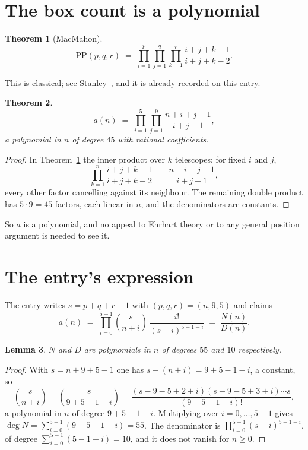 \documentclass[11pt,a4paper]{article}
\theoremstyle{plain}
\newtheorem{theorem}{Theorem}
\newtheorem{lemma}[theorem]{Lemma}
\theoremstyle{definition}
\begin{document}
\section{The box count is a polynomial}

\begin{theorem}[MacMahon]\label{thm:mm}
\[
\mathrm{PP}(p,q,r)\;=\;\prod_{i=1}^{p}\prod_{j=1}^{q}\prod_{k=1}^{r}
\frac{i+j+k-1}{i+j+k-2} .
\]
\end{theorem}

This is classical; see Stanley~\cite{stanley}, and it is already recorded on this entry.

\begin{theorem}\label{thm:poly}
\[
a(n)\;=\;\prod_{i=1}^{5}\prod_{j=1}^{9}\frac{n+i+j-1}{i+j-1},
\]
a polynomial in $n$ of degree $45$ with rational coefficients.
\end{theorem}

\begin{proof}
In Theorem~\ref{thm:mm} the inner product over $k$ telescopes: for fixed $i$ and $j$,
\[
\prod_{k=1}^{n}\frac{i+j+k-1}{i+j+k-2}\;=\;\frac{n+i+j-1}{i+j-1} ,
\]
every other factor cancelling against its neighbour. The remaining double product has
$5\cdot9=45$ factors, each linear in $n$, and the denominators are constants.
\end{proof}

So $a$ is a polynomial, and no appeal to Ehrhart theory or to any general position argument is
needed to see it.

\section{The entry's expression}

The entry writes $s=p+q+r-1$ with $(p,q,r)=(n,9,5)$ and claims
\[
a(n)\;=\;\prod_{i=0}^{5-1}\binom{s}{n+i}\,\frac{i!}{(s-i)^{5-1-i}}\;=\;
\frac{N(n)}{D(n)} .
\]

\begin{lemma}\label{lem:deg}
$N$ and $D$ are polynomials in $n$ of degrees $55$ and $10$ respectively.
\end{lemma}

\begin{proof}
With $s=n+9+5-1$ one has $s-(n+i)=9+5-1-i$, a constant, so
\[
\binom{s}{n+i}=\binom{s}{9+5-1-i}
=\frac{(s-9-5+2+i)(s-9-5+3+i)\cdots s}{(9+5-1-i)!},
\]
a polynomial in $n$ of degree $9+5-1-i$. Multiplying over $i=0,\dots,5-1$ gives
$\deg N=\sum_{i=0}^{5-1}(9+5-1-i)=55$. The denominator is
$\prod_{i=0}^{5-1}(s-i)^{5-1-i}$, of degree
$\sum_{i=0}^{5-1}(5-1-i)=10$, and it does not vanish for $n\ge0$.
\end{proof}
\end{document}
